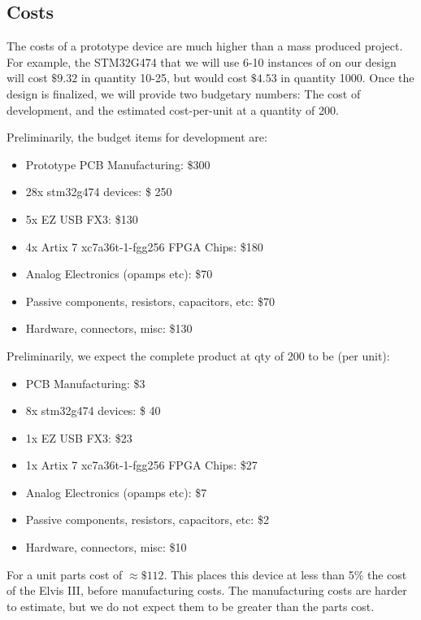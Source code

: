 \subsection{Costs}
	The costs of a prototype device are much higher than a mass produced project. For example, the STM32G474 that we will use 6-10 instances of on our design will cost $\$9.32 $ in quantity 10-25, but would cost $\$4.53$ in quantity 1000. Once the design is finalized, we will provide two budgetary numbers: The cost of development, and the estimated cost-per-unit at a quantity of 200. 
	
	Preliminarily, the budget items for development are:
	
	\begin{itemize}
		\item Prototype PCB Manufacturing: \$300
		\item 28x stm32g474 devices: \$ 250
		\item 5x EZ USB FX3: \$130
		\item 4x Artix 7 xc7a36t-1-fgg256 FPGA Chips: \$180
		\item Analog Electronics (opamps etc): \$70
		\item Passive components, resistors, capacitors, etc: \$70
		\item Hardware, connectors, misc: \$130
	\end{itemize}

	Preliminarily, we expect the complete product at qty of 200 to be (per unit):
	
	\begin{itemize}
		\item PCB Manufacturing: \$3
		\item 8x stm32g474 devices: \$ 40
		\item 1x EZ USB FX3: \$23
		\item 1x Artix 7 xc7a36t-1-fgg256 FPGA Chips: \$27
		\item Analog Electronics (opamps etc): \$7
		\item Passive components, resistors, capacitors, etc: \$2
		\item Hardware, connectors, misc: \$10
	\end{itemize}

	For a unit parts cost of $\approx\$112$. This places this device at less than 5\% the cost of the Elvis III, before manufacturing costs. The manufacturing costs are harder to estimate, but  we do not expect them to be greater than the parts cost.
	
